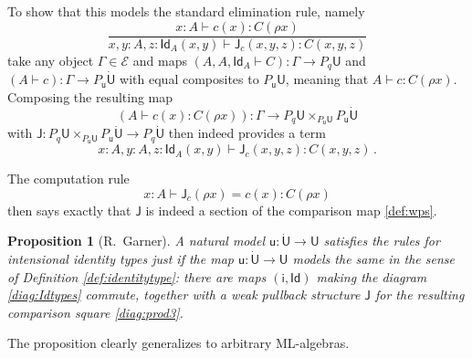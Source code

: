 \documentclass[12pt,reqno]{amsart}
\newcommand{\EE}{\ensuremath{\mathcal{E}}}
\renewcommand{\to}{\ensuremath{\rightarrow}}
\newcommand{\Id}{\mathsf{Id}}
\renewcommand{\t}{\ensuremath{\mathsf{u}}}
\newcommand{\T}{\ensuremath{\mathsf{U}}}
\newcommand{\TT}{\ensuremath{\dot{\mathsf{U}}}}
\newtheorem{proposition}[theorem]{Proposition}
\theoremstyle{remark}
\theoremstyle{definition}
\begin{document}
To show that this models the standard elimination rule, namely
\[
\frac{x:A\vdash c(x) : C(\rho x)}{x, y:A, z : \Id_A(x, y)\vdash \mathsf{J}_c(x,y,z) : C(x,y,z)}
\]
take any object $\Gamma \in \EE$  and maps $(A, A, \Id_{A} \vdash C) : \Gamma \to P_q\T$ and $(A \vdash c) : \Gamma \to P_\t\TT$ with equal composites to $P_\t\T$, meaning that $A \vdash c : C(\rho x)$.  Composing the resulting map 
\[
(A\vdash c(x):C(\rho x)) : \Gamma \to P_q\T \times_{P_\t\T} P_\t\TT
\]
with $\mathsf{J} : P_q\T \times_{P_\t\T} P_\t\TT \to P_q \TT$ then indeed provides a term $$x:A, y:A, z:\Id_{A}(x,y)  \vdash \mathsf{J}_c(x,y,z) : C(x,y,z)\,.$$

The computation rule
\[
x: A \vdash \mathsf{J}_c(\rho x) = c(x) : C(\rho x)
\]
then says exactly that $\mathsf{J}$ is indeed a section of the comparison map \eqref{def:wps}.

\begin{proposition}[R.\ Garner]\label{prop:Id-typesfromML}  A natural model $\t : \TT \to \T$ satisfies the rules for intensional identity types just if the map $\t : \TT \to \T$ \emph{models} the same in the sense of Definition \ref{def:identitytype}: there are maps $(\mathsf{i}, \Id)$ making the diagram \eqref{diag:Idtypes} commute, together with a weak pullback structure $\mathsf{J}$ for the resulting comparison square \eqref{diag:prod3}.
\end{proposition}

The proposition clearly generalizes to arbitrary ML-algebras.
\end{document}
